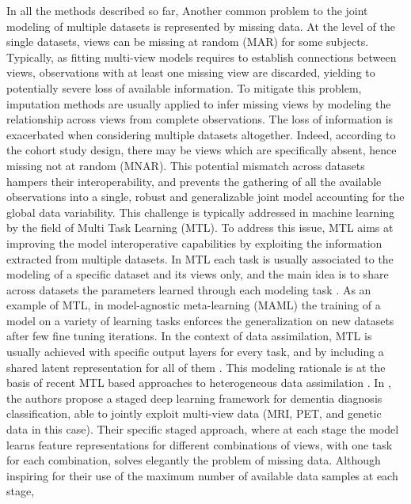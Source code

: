 In all the methods described so far,
Another common problem to the joint modeling of multiple datasets is represented by missing data.
At the level of the single datasets, views can be missing at random (MAR) for some subjects.
Typically, as fitting multi-view models requires to establish connections between views, observations with at least one missing view are discarded, yielding to potentially severe loss of available information.
To mitigate this problem, imputation methods are usually applied to infer missing views by modeling the relationship across views from complete observations.
%
The loss of information is exacerbated when considering multiple datasets altogether.
Indeed, according to the cohort study design, there may be views which are specifically absent, hence missing not at random (MNAR).
This potential mismatch across datasets hampers their interoperability,
and prevents the gathering of all the available observations into a single, robust and generalizable joint model accounting for the global data variability.
%
%
This challenge is typically addressed in machine learning by the field of Multi Task Learning (MTL).
To address this issue, MTL aims at improving the model interoperative capabilities by exploiting the information extracted from multiple datasets.
In MTL each task is usually associated to the modeling of a specific dataset and its views only,
and the main idea is to share across datasets the parameters learned through each modeling task \citep{Caruana1998, Dorado-Moreno2020}.
As an example of MTL, in model-agnostic meta-learning (MAML) \citep{MAML1} the training of a model on a variety of learning tasks enforces the generalization on new datasets after few fine tuning iterations.
%
In the context of data assimilation, MTL is usually achieved with specific output layers for every task, and by including a shared latent representation for all of them \citep{Dorado-Moreno2020}.
This modeling rationale is at the basis of recent MTL based approaches to heterogeneous data assimilation \citep{Wu2018, Shi2019}.
In \cite{Zhou2019a}, the authors propose a staged deep learning framework for dementia diagnosis classification,
able to jointly exploit multi-view data (MRI, PET, and genetic data in this case).
Their specific staged approach, where at each stage the model learns feature representations for different combinations of views, with one task for each combination,
solves elegantly the problem of missing data.
Although inspiring for their use of the maximum number of available data samples at each stage,
